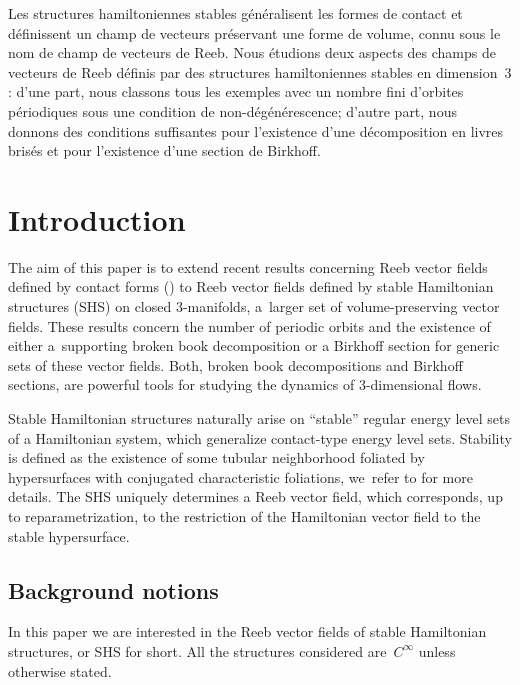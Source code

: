 \documentclass[JEP,XML,SOM,Unicode,NoEqCountersInSection,NoFloatCountersInSection,published]{cedram}
\newcommand{\threemanifolds}{$3$\nobreakdash-mani\-folds\xspace}
\theoremstyle{definition}
\begin{document}
\begin{altabstract}
Les structures hamiltoniennes stables généralisent les formes de contact et définissent un champ de vecteurs préservant une forme de volume, connu sous le nom de champ de vecteurs de Reeb. Nous étudions deux aspects des champs de vecteurs de Reeb définis par des structures hamiltoniennes stables en dimension~$3$: d'une part, nous classons tous les exemples avec un nombre fini d'orbites périodiques sous une condition de non-dégénérescence; d'autre part, nous donnons des conditions suffisantes pour l'existence d'une décomposition en livres brisés et pour l'existence d'une section de Birkhoff.
\end{altabstract}
\maketitle
\vspace*{-\baselineskip}
\tableofcontents
\mainmatter

\vspace*{-3.4\baselineskip}\mbox{}
\section{Introduction}\label{sec:intro}

The aim of this paper is to extend recent results concerning Reeb vector fields defined by contact forms (\cite{CDR,CDHR,CM}) to Reeb vector fields defined by stable Hamiltonian structures (SHS) on closed \threemanifolds, a~larger set of volume-preserving vector fields. These results concern the number of periodic orbits and the existence of either a~supporting broken book decomposition or a Birkhoff section for generic sets of these vector fields. Both, broken book decompositions and Birkhoff sections, are powerful tools for studying the dynamics of 3-dimensional flows.

Stable Hamiltonian structures naturally arise on ``stable'' regular energy level sets of a Hamiltonian system, which generalize contact-type energy level sets. Stability is defined as the existence of some tubular neighborhood foliated by hypersurfaces with conjugated characteristic foliations, we~refer to \cite{HZ,CV1} for more details. The SHS uniquely determines a Reeb vector field, which corresponds, up to reparametrization, to the restriction of the Hamiltonian vector field to the stable hypersurface.

\subsection{Background notions}
In this paper we are interested in the Reeb vector fields of stable Hamiltonian structures, or SHS for short. All the structures considered are~$C^\infty$ unless otherwise stated.
\end{document}
